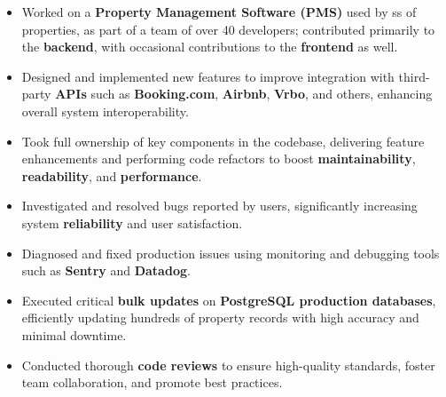 \documentclass[10pt,a4paper,ragged2e,withhyper]{altacv}
\begin{document}
\begin{paracol}{2}


      \begin{itemize}
            \item Worked on a \textbf{Property Management Software (PMS)} used by ss of properties, as part of a team of over 40 developers; contributed primarily to the \textbf{backend}, with occasional contributions to the \textbf{frontend} as well.
            \item Designed and implemented new features to improve integration with third-party \textbf{APIs} such as \textbf{Booking.com}, \textbf{Airbnb}, \textbf{Vrbo}, and others, enhancing overall system interoperability.
            \item Took full ownership of key components in the codebase, delivering feature enhancements and performing code refactors to boost \textbf{maintainability}, \textbf{readability}, and \textbf{performance}.
            \item Investigated and resolved bugs reported by users, significantly increasing system \textbf{reliability} and user satisfaction.
            \item Diagnosed and fixed production issues using monitoring and debugging tools such as \textbf{Sentry} and \textbf{Datadog}.
            \item Executed critical \textbf{bulk updates} on \textbf{PostgreSQL production databases}, efficiently updating hundreds of property records with high accuracy and minimal downtime.
            \item Conducted thorough \textbf{code reviews} to ensure high-quality standards, foster team collaboration, and promote best practices.
        \end{itemize}





\end{paracol}
\end{document}
